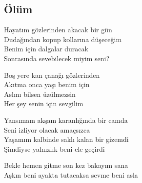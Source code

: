 \subsection{Ölüm}

Hayatım gözlerinden akacak bir gün \\
Dudağından kopup kollarına düşeceğim \\
Benim için dalgalar duracak \\
Sonrasında sevebilecek miyim seni?

\noindent\newline
Boş yere kan çanağı gözlerinden \\
Akıtma onca yaşı benim için \\
Aslını bilsen üzülmezsin \\
Her şey senin için sevgilim

\noindent\newline
Yansımam akşam karanlığında bir camda \\
Seni izliyor olacak amaçsızca \\
Yaşamım kalbinde saklı kalan bir gizemdi \\
Şimdiyse yalnızlık beni ele geçirdi

\noindent\newline
Bekle hemen gitme son kez bakayım sana \\
Aşkın beni ayakta tutacaksa sevme beni asla